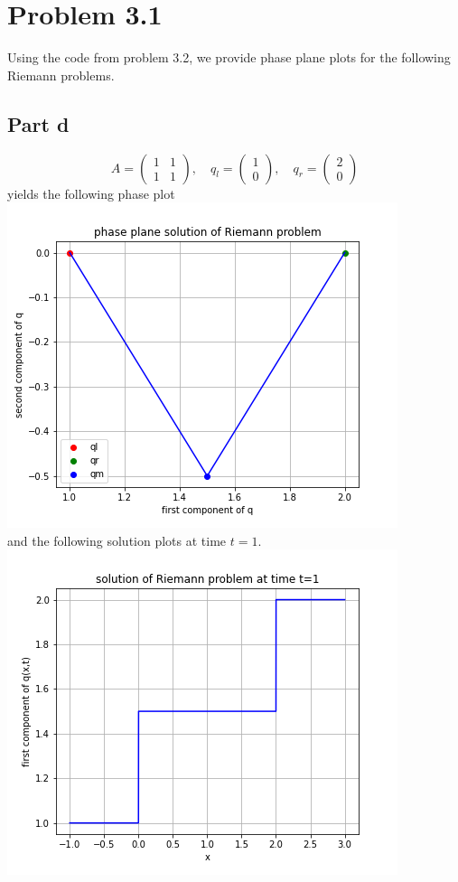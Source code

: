 \documentclass{article}
\begin{document}
\section{Problem 3.1}
Using the code from problem 3.2, we provide phase plane plots for the following Riemann problems. 
\subsection{Part d}
\[
A=\begin{pmatrix}
	1&1\\1&1
\end{pmatrix},\quad q_l=\begin{pmatrix}
1\\0
\end{pmatrix},\quad q_r=\begin{pmatrix}
2\\0
\end{pmatrix}
\]
yields the following phase plot\\
\includegraphics[scale=0.7]{partd.png}\\
and the following solution plots at time $t=1$.\\
\includegraphics[scale=0.7]{partd1.png}\\
\end{document}
